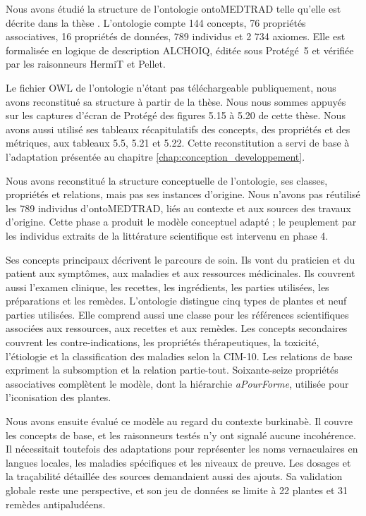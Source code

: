 Nous avons étudié la structure de l'ontologie ontoMEDTRAD telle qu'elle est décrite dans la thèse \cite{kouame_systeme_2018}. L'ontologie compte 144 concepts, 76 propriétés associatives, 16 propriétés de données, 789 individus et 2 734 axiomes. Elle est formalisée en logique de description ALCHOIQ, éditée sous Protégé~5 et vérifiée par les raisonneurs HermiT et Pellet.

Le fichier OWL de l'ontologie n'étant pas téléchargeable publiquement, nous avons reconstitué sa structure à partir de la thèse. Nous nous sommes appuyés sur les captures d'écran de Protégé des figures 5.15 à 5.20 de cette thèse. Nous avons aussi utilisé ses tableaux récapitulatifs des concepts, des propriétés et des métriques, aux tableaux 5.5, 5.21 et 5.22. Cette reconstitution a servi de base à l'adaptation présentée au chapitre \ref{chap:conception_developpement}.

Nous avons reconstitué la structure conceptuelle de l'ontologie, ses classes, propriétés et relations, mais pas ses instances d'origine. Nous n'avons pas réutilisé les 789 individus d'ontoMEDTRAD, liés au contexte et aux sources des travaux d'origine. Cette phase a produit le modèle conceptuel adapté ; le peuplement par les individus extraits de la littérature scientifique est intervenu en phase 4.

Ses concepts principaux décrivent le parcours de soin. Ils vont du praticien et du patient aux symptômes, aux maladies et aux ressources médicinales. Ils couvrent aussi l'examen clinique, les recettes, les ingrédients, les parties utilisées, les préparations et les remèdes. L'ontologie distingue cinq types de plantes et neuf parties utilisées. Elle comprend aussi une classe pour les références scientifiques associées aux ressources, aux recettes et aux remèdes. Les concepts secondaires couvrent les contre-indications, les propriétés thérapeutiques, la toxicité, l'étiologie et la classification des maladies selon la CIM-10. Les relations de base expriment la subsomption et la relation partie-tout. Soixante-seize propriétés associatives complètent le modèle, dont la hiérarchie \textit{aPourForme}, utilisée pour l'iconisation des plantes.

Nous avons ensuite évalué ce modèle au regard du contexte burkinabè. Il couvre les concepts de base, et les raisonneurs testés n'y ont signalé aucune incohérence. Il nécessitait toutefois des adaptations pour représenter les noms vernaculaires en langues locales, les maladies spécifiques et les niveaux de preuve. Les dosages et la traçabilité détaillée des sources demandaient aussi des ajouts. Sa validation globale reste une perspective, et son jeu de données se limite à 22 plantes et 31 remèdes antipaludéens.

